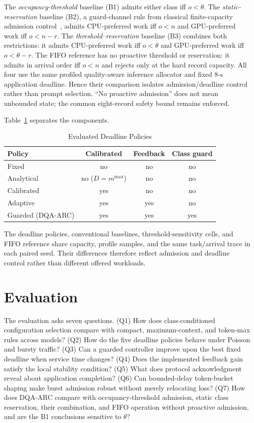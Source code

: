 \documentclass[journal]{IEEEtran}
\newcommand{\method}{DQA-ARC}
\begin{document}
The \emph{occupancy-threshold} baseline (B1) admits either class iff $o<\theta$. The \emph{static-reservation} baseline (B2), a guard-channel rule from classical finite-capacity admission control~\cite{kelly1991loss}, admits CPU-preferred work iff $o<n$ and GPU-preferred work iff $o<n-r$. The \emph{threshold--reservation} baseline (B3) combines both restrictions: it admits CPU-preferred work iff $o<\theta$ and GPU-preferred work iff $o<\theta-r$. The FIFO reference has no proactive threshold or reservation: it admits in arrival order iff $o<n$ and rejects only at the hard record capacity. All four use the same profiled quality-aware inference allocator and fixed 8-s application deadline. Hence their comparison isolates admission/deadline control rather than prompt selection. ``No proactive admission'' does not mean unbounded state; the common eight-record safety bound remains enforced.

Table~\ref{tab:policies} separates the components.

\begin{table}[t]
\centering
\caption{Evaluated Deadline Policies}
\label{tab:policies}
\footnotesize
\begin{tabular}{@{}lccc@{}}
\toprule
Policy & Calibrated & Feedback & Class guard \\
\midrule
Fixed & no & no & no \\
Analytical & no ($D=m^{\max}$) & no & no \\
Calibrated & yes & no & no \\
Adaptive & yes & yes & no \\
Guarded (\method{}) & yes & yes & yes \\
\bottomrule
\end{tabular}
\end{table}

The deadline policies, conventional baselines, threshold-sensitivity cells, and FIFO reference share capacity, profile samples, and the same task/arrival trace in each paired seed. Their differences therefore reflect admission and deadline control rather than different offered workloads.
\section{Evaluation}
\label{sec:evaluation}

The evaluation asks seven questions. (Q1) How does class-conditioned configuration selection compare with compact, maximum-context, and token-max rules across models? (Q2) How do the five deadline policies behave under Poisson and bursty traffic? (Q3) Can a guarded controller improve upon the best fixed deadline when service time changes? (Q4) Does the implemented feedback gain satisfy the local stability condition? (Q5) What does protocol acknowledgment reveal about application completion? (Q6) Can bounded-delay token-bucket shaping make burst admission robust without merely relocating loss? (Q7) How does \method{} compare with occupancy-threshold admission, static class reservation, their combination, and FIFO operation without proactive admission, and are the B1 conclusions sensitive to $\theta$?
\end{document}
